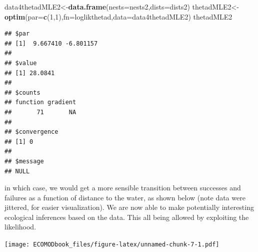 \documentclass[
]{book}
\newenvironment{Shaded}{\begin{snugshade}}{\end{snugshade}}
\newcommand{\AttributeTok}[1]{\textcolor[rgb]{0.13,0.29,0.53}{#1}}
\newcommand{\DecValTok}[1]{\textcolor[rgb]{0.00,0.00,0.81}{#1}}
\newcommand{\FloatTok}[1]{\textcolor[rgb]{0.00,0.00,0.81}{#1}}
\newcommand{\FunctionTok}[1]{\textcolor[rgb]{0.13,0.29,0.53}{\textbf{#1}}}
\newcommand{\NormalTok}[1]{#1}
\newcommand{\OtherTok}[1]{\textcolor[rgb]{0.56,0.35,0.01}{#1}}
\newcommand{\SpecialCharTok}[1]{\textcolor[rgb]{0.81,0.36,0.00}{\textbf{#1}}}
\newcommand{\StringTok}[1]{\textcolor[rgb]{0.31,0.60,0.02}{#1}}
\begin{document}
\begin{Shaded}
\begin{Highlighting}[]
\NormalTok{data4thetadMLE2}\OtherTok{\textless{}{-}}\FunctionTok{data.frame}\NormalTok{(}\AttributeTok{nests=}\NormalTok{nests2,}\AttributeTok{dists=}\NormalTok{dists2)}
\NormalTok{thetadMLE2}\OtherTok{\textless{}{-}}\FunctionTok{optim}\NormalTok{(}\AttributeTok{par=}\FunctionTok{c}\NormalTok{(}\DecValTok{1}\NormalTok{,}\DecValTok{1}\NormalTok{),}\AttributeTok{fn=}\NormalTok{loglikthetad,}\AttributeTok{data=}\NormalTok{data4thetadMLE2)}
\NormalTok{thetadMLE2}
\end{Highlighting}
\end{Shaded}

\begin{verbatim}
## $par
## [1]  9.667410 -6.801157
## 
## $value
## [1] 28.0841
## 
## $counts
## function gradient 
##       71       NA 
## 
## $convergence
## [1] 0
## 
## $message
## NULL
\end{verbatim}

in which case, we would get a more sensible transition between successes and failures as a function of distance to the water, as shown below (note data were jittered, for easier visualization). We are now able to make potentially interesting ecological inferences based on the data. This all being allowed by exploiting the likelihood.

\begin{Shaded}
\end{Shaded}

\texttt{[image: ECOMODbook\_files/figure-latex/unnamed-chunk-7-1.pdf]}
\end{document}
